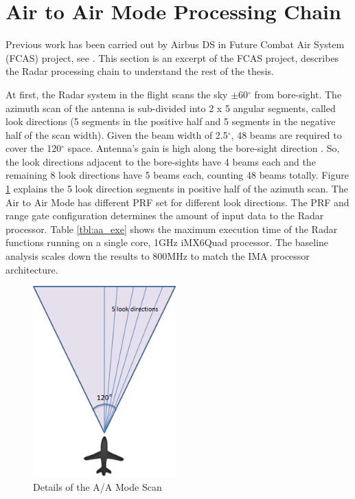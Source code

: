 \section{Air to Air Mode Processing Chain}
\label{sec:bg_related_work:proc_chain}
Previous work has been carried out by Airbus DS in Future Combat Air System (FCAS) project, see \cite{fcas}. This section is an excerpt of the FCAS project, describes the Radar processing chain to understand the rest of the thesis.

At first, the Radar system in the flight scans the sky $\pm$60$^{\circ}$ from bore-sight. The azimuth scan of the antenna is sub-divided into 2 x 5 angular segments, called look directions (5 segments in the positive half and 5 segments in the negative half of the scan width). Given the beam width of 2.5$^{\circ}$, 48 beams are required to cover the 120$^{\circ}$ space. Antenna's gain is high along the bore-sight direction \cite{boreSight}\cite{bsTR}. So, the look directions adjacent to the bore-sights have 4 beams each and the remaining 8 look directions have 5 beams each, counting 48 beams totally. Figure \ref{fig:bg_related_work:aa_look_dir} explains the 5 look direction segments in positive half of the azimuth scan. The Air to Air Mode has different PRF set for different look directions. The PRF and range gate configuration determines the amount of input data to the Radar processor. Table \ref{tbl:aa_exe} shows the maximum execution time of the Radar functions running on a single core, 1GHz iMX6Quad processor. The baseline analysis scales down the results to 800MHz to match the IMA processor architecture.

\begin{figure}[h!]
	\centering
	\includegraphics[width=55mm]{figures/look_dir}
	\caption{Details of the A/A Mode Scan}
	\label{fig:bg_related_work:aa_look_dir}
\end{figure}

